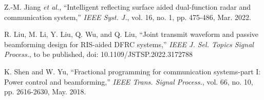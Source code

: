 \documentclass[Conference,a4paper]{IEEEtran}
\begin{document}
\begin{thebibliography}{99}
 Z.-M. Jiang \textit{et al.}, ``Intelligent reflecting surface aided dual-function radar and communication system,'' \textit{IEEE Syst. J.}, vol. 16, no. 1, pp. 475-486, Mar. 2022.

 R. Liu, M. Li, Y. Liu, Q. Wu, and Q. Liu, ``Joint transmit waveform and passive beamforming design for RIS-aided DFRC systems,'' \textit{IEEE J. Sel. Topics Signal Process.}, to be published, doi: 10.1109/JSTSP.2022.3172788


 K. Shen and W. Yu, ``Fractional programming for communication systems-part I: Power control and beamforming,'' \textit{IEEE Trans. Signal Process.}, vol. 66, no. 10, pp. 2616-2630, May. 2018.
\end{thebibliography}
\end{document}
